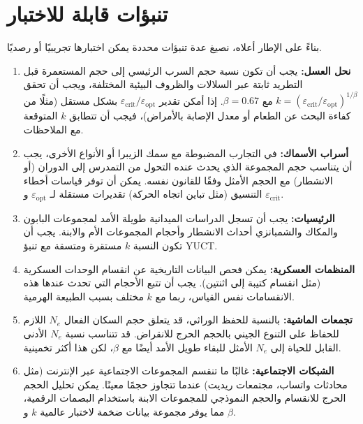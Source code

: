 \documentclass[12pt]{article}
\theoremstyle{remark}
\begin{document}
	\section{تنبؤات قابلة للاختبار}
	\label{sec:predictions}
	
	بناءً على الإطار أعلاه، نصيغ عدة تنبؤات محددة يمكن اختبارها تجريبيًا أو رصديًا.
	
	\begin{enumerate}
		\item \textbf{نحل العسل:} يجب أن تكون نسبة حجم السرب الرئيسي إلى حجم المستعمرة قبل التطريد ثابتة عبر السلالات والظروف البيئية المختلفة، ويجب أن تحقق \(k = (\varepsilon_{\text{crit}}/\varepsilon_{\text{opt}})^{1/\beta}\) مع \(\beta = 0.67\). إذا أمكن تقدير \(\varepsilon_{\text{crit}}/\varepsilon_{\text{opt}}\) بشكل مستقل (مثلًا من كفاءة البحث عن الطعام أو معدل الإصابة بالأمراض)، فيجب أن تتطابق \(k\) المتوقعة مع الملاحظات.
		
		\item \textbf{أسراب الأسماك:} في التجارب المضبوطة مع سمك الزيبرا أو الأنواع الأخرى، يجب أن يتناسب حجم المجموعة الذي يحدث عنده التحول من التمدرس إلى الدوران (أو الانشطار) مع الحجم الأمثل وفقًا للقانون نفسه. يمكن أن توفر قياسات أخطاء التنسيق (مثل تباين اتجاه الحركة) تقديرات مستقلة لـ \(\varepsilon_{\text{opt}}\) و \(\varepsilon_{\text{crit}}\).
		
		\item \textbf{الرئيسيات:} يجب أن تسجل الدراسات الميدانية طويلة الأمد لمجموعات البابون والمكاك والشمبانزي أحداث الانشطار وأحجام المجموعات الأم والابنة. يجب أن تكون النسبة \(k\) مستقرة ومتسقة مع تنبؤ YUCT.
		
		\item \textbf{المنظمات العسكرية:} يمكن فحص البيانات التاريخية عن انقسام الوحدات العسكرية (مثل انقسام كتيبة إلى اثنتين). يجب أن تتبع الأحجام التي تحدث عندها هذه الانقسامات نفس القياس، ربما مع \(k\) مختلف بسبب الطبيعة الهرمية.
		
		\item \textbf{تجمعات الماشية:} بالنسبة للحفظ الوراثي، قد يتعلق حجم السكان الفعال \(N_e\) اللازم للحفاظ على التنوع الجيني بالحجم الحرج للانقراض. قد تتناسب نسبة \(N_e\) الأدنى القابل للحياة إلى \(N_e\) الأمثل للبقاء طويل الأمد أيضًا مع \(\beta\)، لكن هذا أكثر تخمينية.
		
		\item \textbf{الشبكات الاجتماعية:} غالبًا ما تنقسم المجموعات الاجتماعية عبر الإنترنت (مثل محادثات واتساب، مجتمعات ريديت) عندما تتجاوز حجمًا معينًا. يمكن تحليل الحجم الحرج للانقسام والحجم النموذجي للمجموعات الابنة باستخدام البصمات الرقمية، مما يوفر مجموعة بيانات ضخمة لاختبار عالمية \(k\) و \(\beta\).
	\end{enumerate}
	
\end{document}
